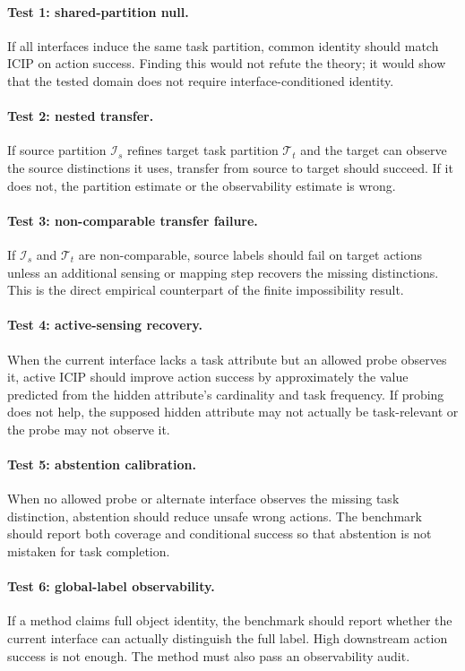 \documentclass{article}
\newcommand{\icip}{\textsc{ICIP}}
\newcommand{\task}{\mathcal{T}}
\newcommand{\ident}{\mathcal{I}}
\begin{document}
\paragraph{Test 1: shared-partition null.}
If all interfaces induce the same task partition, common identity should match \icip{} on action success.
Finding this would not refute the theory; it would show that the tested domain does not require interface-conditioned identity.

\paragraph{Test 2: nested transfer.}
If source partition $\ident_s$ refines target task partition $\task_t$ and the target can observe the source distinctions it uses, transfer from source to target should succeed.
If it does not, the partition estimate or the observability estimate is wrong.

\paragraph{Test 3: non-comparable transfer failure.}
If $\ident_s$ and $\task_t$ are non-comparable, source labels should fail on target actions unless an additional sensing or mapping step recovers the missing distinctions.
This is the direct empirical counterpart of the finite impossibility result.

\paragraph{Test 4: active-sensing recovery.}
When the current interface lacks a task attribute but an allowed probe observes it, active \icip{} should improve action success by approximately the value predicted from the hidden attribute's cardinality and task frequency.
If probing does not help, the supposed hidden attribute may not actually be task-relevant or the probe may not observe it.

\paragraph{Test 5: abstention calibration.}
When no allowed probe or alternate interface observes the missing task distinction, abstention should reduce unsafe wrong actions.
The benchmark should report both coverage and conditional success so that abstention is not mistaken for task completion.

\paragraph{Test 6: global-label observability.}
If a method claims full object identity, the benchmark should report whether the current interface can actually distinguish the full label.
High downstream action success is not enough.
The method must also pass an observability audit.
\end{document}
